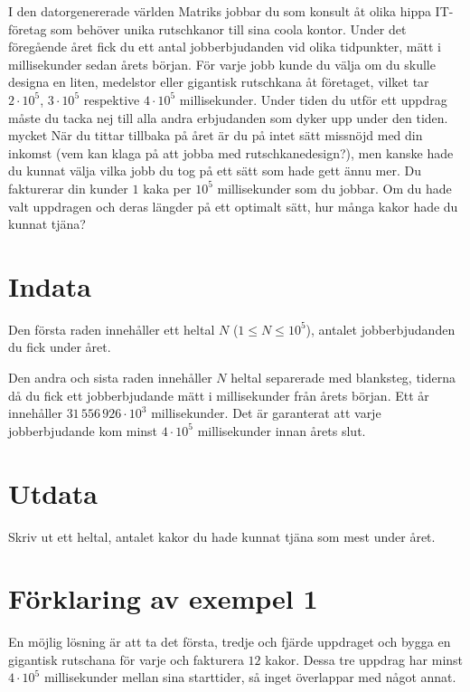 I den datorgenererade världen Matriks jobbar du som konsult åt olika hippa IT-företag som behöver unika rutschkanor till sina coola kontor.
Under det föregående året fick du ett antal jobberbjudanden vid olika tidpunkter, mätt i millisekunder sedan årets början.
För varje jobb kunde du välja om du skulle designa en liten, medelstor eller gigantisk rutschkana åt företaget, vilket tar $2 \cdot 10^5$, $3 \cdot 10^5$ respektive $4 \cdot 10^5$ millisekunder.
Under tiden du utför ett uppdrag måste du tacka nej till alla andra erbjudanden som dyker upp under den tiden.
mycket
När du tittar tillbaka på året är du på intet sätt missnöjd med din inkomst (vem kan klaga på att jobba med rutschkanedesign?), men kanske hade du kunnat välja vilka jobb du tog på ett sätt som hade gett ännu mer.
Du fakturerar din kunder $1$ kaka per $10^5$ millisekunder som du jobbar.
Om du hade valt uppdragen och deras längder på ett optimalt sätt, hur många kakor hade du kunnat tjäna?


\section*{Indata}
Den första raden innehåller ett heltal $N$ ($1 \le N \le 10^5$), antalet jobberbjudanden du fick under året.

Den andra och sista raden innehåller $N$ heltal separerade med blanksteg, tiderna då du fick ett jobberbjudande mätt i millisekunder från årets början.
Ett år innehåller $31\,556\,926 \cdot 10^3$ millisekunder.
Det är garanterat att varje jobberbjudande kom minst $4 \cdot 10^5$ millisekunder innan årets slut.

\section*{Utdata}
Skriv ut ett heltal, antalet kakor du hade kunnat tjäna som mest under året.

\section*{Förklaring av exempel 1}
En möjlig lösning är att ta det första, tredje och fjärde uppdraget och bygga en gigantisk rutschana för varje och fakturera $12$ kakor.
Dessa tre uppdrag har minst $4 \cdot 10^5$ millisekunder mellan sina starttider, så inget överlappar med något annat.
